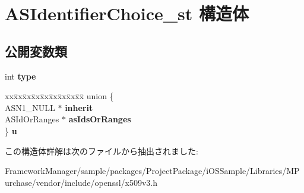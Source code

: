 \hypertarget{struct_a_s_identifier_choice__st}{}\section{A\+S\+Identifier\+Choice\+\_\+st 構造体}
\label{struct_a_s_identifier_choice__st}
\subsection*{公開変数類}
\begin{DoxyCompactItemize}
\item 
\hypertarget{struct_a_s_identifier_choice__st_a370e530aebd1097c5f216cf0ae19b170}{}int {\bfseries type}\label{struct_a_s_identifier_choice__st_a370e530aebd1097c5f216cf0ae19b170}

\item 
\hypertarget{struct_a_s_identifier_choice__st_ac6c704ee8728788618049445d92b5580}{}\begin{tabbing}
xx\=xx\=xx\=xx\=xx\=xx\=xx\=xx\=xx\=\kill
union \{\\
\>ASN1\_NULL $\ast$ {\bfseries inherit}\\
\>ASIdOrRanges $\ast$ {\bfseries asIdsOrRanges}\\
\} {\bfseries u}\label{struct_a_s_identifier_choice__st_ac6c704ee8728788618049445d92b5580}
\\

\end{tabbing}\end{DoxyCompactItemize}


この構造体詳解は次のファイルから抽出されました\+:\begin{DoxyCompactItemize}
\item 
Framework\+Manager/sample/packages/\+Project\+Package/i\+O\+S\+Sample/\+Libraries/\+M\+Purchase/vendor/include/openssl/x509v3.\+h\end{DoxyCompactItemize}
